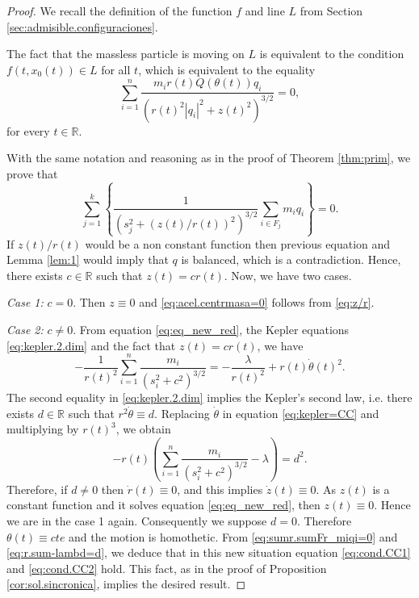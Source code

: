 \documentclass[smallcondensed]{svjour3}
\newcommand{\rr}{\mathbb{R}}
\begin{document}
\begin{proof}
 We recall the definition of the function $f$ and line $L$ from  Section \ref{sec:admisible.configuraciones}.

The fact that the massless particle is moving on $L$ is equivalent to the condition $f(t,x_0(t))\in L$ for all $t$, 
which is equivalent to the equality
\begin{equation}\label{eq:z/r}
 \sum_{i=1}^n\frac{m_ir(t)Q(\theta (t))q_i}{\left(r(t)^2|q_i|^2+z(t)^2\right)^{3/2}}=0,
\end{equation}
for every $t\in \rr$.

With the same notation and reasoning as in the proof of Theorem \ref{thm:prim}, we prove that
\begin{equation}\label{eq:sumr.sumFr_miqi=0}
\sum_{j=1}^k\left\{\frac{1}{(s_j^{2}+(z(t)/r(t))^2)^{3/2}}\sum_{i\in F_j}m_iq_i\right\}=0.
\end{equation}
If $z(t)/r(t)$  would be a non constant function then previous equation and Lemma \ref{lem:1} would imply that $q$ is balanced, which is a contradiction. Hence, there exists $c\in \rr$ such that $z(t)=cr(t)$. Now, we have two cases.

\emph{Case 1:} $c=0$. Then $z\equiv 0$ and \eqref{eq:acel.centrmasa=0} follows from \eqref{eq:z/r}.

\emph{Case 2:} $c\neq 0$. From equation \eqref{eq:eq_new_red}, the Kepler equations \eqref{eq:kepler.2.dim} and the fact that $z(t)=cr(t)$, we have 
\begin{equation}\label{eq:kepler=CC}
 -\frac{1}{r(t)^2}\sum_{i=1}^{n}\frac{m_i}{(s_i^2+c^2)^{3/2}}=-\frac{\lambda}{r(t)^2}+r(t)\dot{\theta}(t)^2.
\end{equation}
The second equality in \eqref{eq:kepler.2.dim} implies the Kepler's second law, i.e. there exists $d\in\rr$ such that $r^2\dot{\theta}\equiv d$. Replacing $\dot{\theta}$ in equation \eqref{eq:kepler=CC} and multiplying by $r(t)^3$, we obtain
\begin{equation}\label{eq:r.sum-lambd=d}
-r(t)\left(\sum_{i=1}^{n}\frac{m_i}{(s_i^2+c^2)^{3/2}}-\lambda\right)=d^2.
\end{equation}
Therefore, if $d\neq 0$ then $\dot{r}(t)\equiv 0$, and this implies $\dot{z}(t)\equiv 0$. As $z(t)$ is a constant function and it solves equation \eqref{eq:eq_new_red}, then $z(t)\equiv 0$. Hence we are in the case 1 again. Consequently we suppose $d=0$. Therefore $\theta(t)\equiv cte$ and the motion is homothetic. From \eqref{eq:sumr.sumFr_miqi=0} and \eqref{eq:r.sum-lambd=d}, we deduce that in this new situation equation \eqref{eq:cond.CC1} and \eqref{eq:cond.CC2} hold. This fact, as in the proof of Proposition \ref{cor:sol.sincronica}, implies the desired result.
\end{proof}
\end{document}

